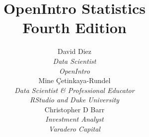 
\title{\huge OpenIntro Statistics\vspace{1.5mm} \\
    \Large Fourth Edition}
\author{David Diez \\
\small\emph{Data Scientist}\\
\small\emph{OpenIntro} \\[6mm]
Mine \c{C}etinkaya-Rundel \\
\small\emph{Data Scientist \& Professional Educator}\\
\small\emph{RStudio and Duke University} \\[6mm]
Christopher D Barr \\
\small\emph{Investment Analyst} \\
\small\emph{Varadero Capital} \\
}
